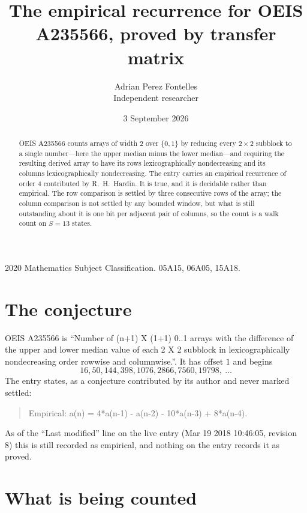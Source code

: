 \documentclass[11pt,a4paper]{article}
\title{The empirical recurrence for OEIS A235566, proved by transfer matrix}
\author{Adrian Perez Fontelles\\ \small Independent researcher}
\date{3 September 2026}
\theoremstyle{plain}
\theoremstyle{definition}
\begin{document}
\maketitle

\begin{abstract}
OEIS A235566 counts arrays of width $2$ over $\{0,1\}$ by reducing every $2\times2$ subblock to a
single number---here the upper median minus the lower median---and requiring the resulting derived array to have its rows
lexicographically nondecreasing and its columns lexicographically nondecreasing. The entry carries an
empirical recurrence of order $4$ contributed by R.~H.~Hardin. It is true, and it is
decidable rather than empirical. The row comparison is settled by three consecutive rows of the
array; the column comparison is not settled by any bounded window, but what is still outstanding
about it is one bit per adjacent pair of columns, so the count is a walk count on $S=13$
states.
\end{abstract}

\noindent\small 2020 Mathematics Subject Classification. 05A15, 06A05, 15A18.\normalsize

\section{The conjecture}

OEIS A235566 is ``Number of (n+1) X (1+1) 0..1 arrays with the difference of the upper and lower median value of each 2 X 2 subblock in lexicographically nondecreasing order rowwise and columnwise.''. It has offset $1$ and begins
\[
16, 50, 144, 398, 1076, 2866, 7560, 19798,\ \dots
\]
The entry states, as a conjecture contributed by its author and never marked settled:
\begin{quote}
Empirical: a(n) = 4*a(n-1) - a(n-2) - 10*a(n-3) + 8*a(n-4).
\end{quote}
As of the ``Last modified'' line on the live entry (Mar 19 2018 10:46:05, revision 8) this is still
recorded as empirical, and nothing on the entry records it as proved.

\section{What is being counted}
\end{document}
